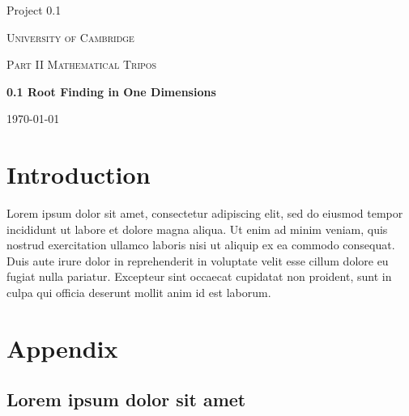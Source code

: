 \documentclass{article}
\begin{document}
    \begin{titlepage}
        \begin{flushleft}
            Project 0.1
        \end{flushleft}
        \vfill
        \centering
        {\scshape\LARGE University of Cambridge \par}
        \vspace{1cm}
        {\scshape\Large Part II Mathematical Tripos \par}
        \vspace{1.5cm}
        {\huge\bfseries 0.1 Root Finding in One Dimensions \par}
        \vspace{2cm}

        \vfill
        {\large \today\par}
    \end{titlepage}
  
  \section{Introduction}
  
  Lorem ipsum dolor sit amet, consectetur adipiscing elit, sed do eiusmod tempor incididunt ut labore et dolore magna aliqua. Ut enim ad minim veniam, quis nostrud exercitation ullamco laboris nisi ut aliquip ex ea commodo consequat. Duis aute irure dolor in reprehenderit in voluptate velit esse cillum dolore eu fugiat nulla pariatur. Excepteur sint occaecat cupidatat non proident, sunt in culpa qui officia deserunt mollit anim id est laborum. 

  \newpage
  \clearpage
  \section{Appendix}
    \subsection{Lorem ipsum dolor sit amet}
    \label{testRK4}
\end{document}
